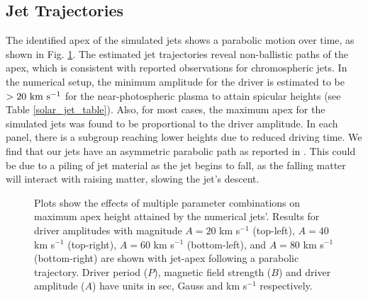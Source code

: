 \subsection{Jet Trajectories}
\label{subsec:jet_traj}
The identified apex of the simulated jets shows a parabolic motion over time, as shown in Fig. \ref{jet_traj}. The estimated jet trajectories reveal non-ballistic paths of the apex, which is consistent with reported observations \citep{Hansteen2006ApJ, Rouppe2007ApJ660L169R, Pontieu2007PASJ} for chromospheric jets. In the numerical setup, the minimum amplitude for the driver is estimated to be $>20 ~\rm{km ~s^{-1}}$ for the near-photospheric plasma to attain spicular heights (see Table \ref{solar_jet_table}). Also, for most cases, the maximum apex for the simulated jets was found to be proportional to the driver amplitude. In each panel, there is a subgroup reaching lower heights due to reduced driving time. We find that our jets have an asymmetric parabolic path as reported in \cite{Singh2019}. This could be due to a piling of jet material as the jet begins to fall, as the falling matter will interact with raising matter, slowing the jet's descent.
\begin{figure}
\captionsetup[subfigure]{labelformat=empty}
\centering
{}
\caption{Plots show the effects of multiple parameter combinations on maximum apex height attained by the numerical jets'. Results for driver amplitudes with magnitude $A = 20$ km s$^{-1}$ (top-left), $A = 40$ km s$^{-1}$ (top-right), $A = 60$ km s$^{-1}$ (bottom-left), and $A = 80$ km s$^{-1}$ (bottom-right) are shown with jet-apex following a parabolic trajectory. Driver period ($P$), magnetic field strength ($B$) and driver amplitude ($A$) have units in sec, Gauss and km s$^{-1}$ respectively.}
\label{jet_traj}
\end{figure}
